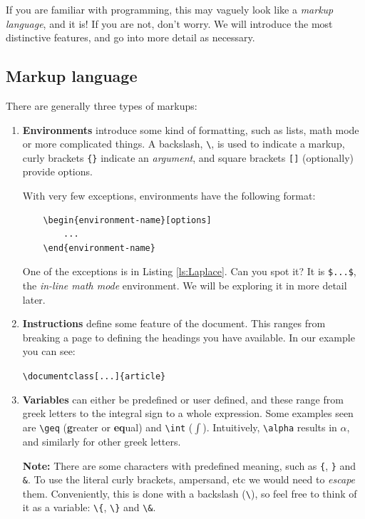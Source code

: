 If you are familiar with programming, this may vaguely look like a \emph{markup language}, and it is!
If you are not, don't worry. We will introduce the most distinctive features, and go into more detail as necessary.

\subsection{Markup language}
There are generally three types of markups:
\begin{enumerate}
    \item \textbf{Environments} introduce some kind of formatting, such as lists, math mode or more complicated things. A backslash, \verb|\|, is used to indicate a markup, curly brackets \verb|{}| indicate an \emph{argument}, and square brackets \verb|[]| (optionally) provide options.
    
    With very few exceptions, environments have the following format:
    
    \begin{lstlisting}
    \begin{environment-name}[options]
        ...
    \end{environment-name}
    \end{lstlisting}
    
    One of the exceptions is in Listing \ref{ls:Laplace}. Can you spot it? It is \verb|$...$|, the \emph{in-line math mode} environment. We will be exploring it in more detail later.

    \item \textbf{Instructions} define some feature of the document. This ranges from breaking a page to defining the  headings you have available. In our example you can see:

    \verb|\documentclass[...]{article}|
    
    \item \textbf{Variables} can either be predefined or user defined, and these range from greek letters to the integral sign to a whole expression.
    Some examples seen are \verb|\geq| (\textbf{g}reater or \textbf{eq}ual) and \verb|\int| ($\int$). Intuitively, \verb|\alpha| results in $\alpha$, and similarly for other greek letters.  
    
    \textbf{Note:} There are some characters with predefined meaning, such as \verb|{|, \verb|}| and \verb|&|. To use the literal curly brackets, ampersand, etc we would need to \emph{escape} them. Conveniently, this is done with a backslash (\verb|\|), so feel free to think of it as a variable: \verb|\{|, \verb|\}| and \verb|\&|.
\end{enumerate} 

